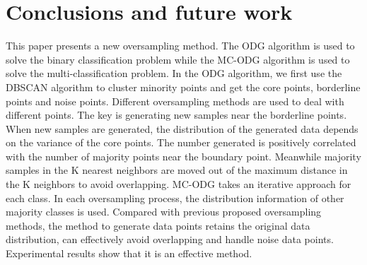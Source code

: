 \documentclass[runningheads]{llncs}
\begin{document}
\section{Conclusions and future work}
This paper presents a new oversampling method. 
The ODG algorithm is used to solve the binary classification problem while the MC-ODG algorithm
 is used to solve the multi-classification problem. In the ODG algorithm, 
 we first use the DBSCAN algorithm to cluster minority points and
 get the core points, borderline points and noise points.
 Different oversampling methods are used to deal with different points.
The key is generating new samples near the borderline points.
When new samples are generated, 
the distribution of the generated data depends on the variance of the core points.
The number generated is positively correlated with the number of majority points near the boundary point.
Meanwhile majority samples in the K nearest neighbors 
are moved out of the maximum distance in the K neighbors to avoid overlapping.
MC-ODG takes an iterative approach for each class. 
In each oversampling process, the distribution information of other majority classes is used.
Compared with previous proposed oversampling methods, 
the method to generate data points retains the original data distribution, 
can effectively avoid overlapping and handle noise data points.
Experimental results show that it is an effective method.
\end{document}
